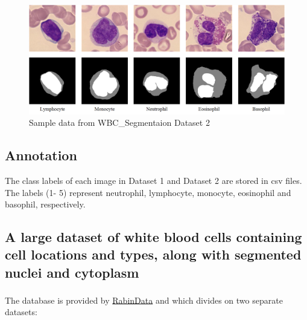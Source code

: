 \begin{figure}[H]
\centering
\includegraphics[width=5.2in]{../images/WBC_Dataset2.png}
\caption{Sample data from WBC\_Segmentaion Dataset 2}
\label{fig:WBC_Dataset2_sample}
\end{figure}

\subsection{Annotation}
\hspace{\parindent}
The class labels of each image in Dataset 1 and Dataset 2 are stored in csv files. The labels (1- 5) represent neutrophil, lymphocyte, monocyte, eosinophil and basophil, respectively.


\subsection{A large dataset of white blood cells containing cell locations and types, along with segmented nuclei and cytoplasm}
\hspace{\parindent}
The database is provided by \href{https://raabindata.com/free-data/#double-labeled-cropped-cells}{RabinData} and \textsuperscript{\cite{Kouzehkanan2022}} which divides on two separate datasets:

